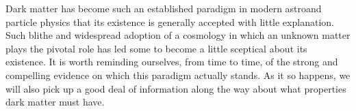 Dark matter has become such an established paradigm in modern astroand particle physics that its existence is generally accepted with little explanation. Such blithe and widespread adoption of a cosmology in which an unknown matter plays the pivotal role has led some to become a little sceptical about its existence. It is worth reminding ourselves, from time to time, of the strong and compelling evidence on which this paradigm actually stands. As it so happens, we will also pick up a good deal of information along the way about what properties dark matter must have.